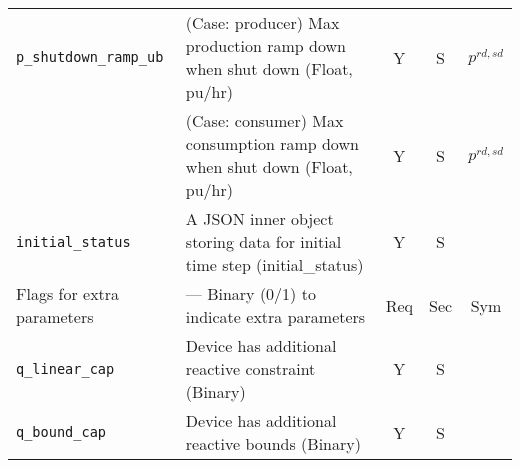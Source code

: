 \documentclass{article}
\begin{document}
\begin{center}
\begin{tabular}{ l | l | c | c | c |}
  {\tt p\_shutdown\_ramp\_ub}& {(Case: producer) Max production ramp down when shut down (Float, pu/hr)} & Y & S & $p^{rd,sd}$\\
                             & {(Case: consumer) Max consumption ramp down when shut down (Float, pu/hr)} & Y & S & $p^{rd,sd}$\\
  \hline
  {\tt initial\_status} & A JSON inner object storing data for initial time step (initial\_status) & Y & S &  \\
  \hline
  Flags for extra parameters & --- Binary (0/1) to indicate extra parameters & Req & Sec & Sym\\
   \hline
  {\tt q\_linear\_cap}      & Device has additional reactive constraint (Binary) & Y & S & \\
  {\tt q\_bound\_cap}       & Device has additional reactive bounds (Binary) & Y & S & \\
  \hline
\end{tabular}
\end{center}
\end{document}
